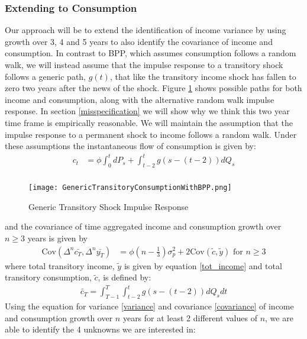 \documentclass[titlepage]{\econtex}\newcommand{\texname}{IncomeUncertainty}
\begin{document}
\subsubsection{Extending \cite{carroll_nature_1997} to Consumption}
Our approach will be to extend the identification of income variance by using growth over 3, 4 and 5 years to also identify the covariance of income and consumption. In contrast to BPP, which assumes consumption follows a random walk, we will instead assume that the impulse response to a transitory shock follows a generic path, $g(t)$, that like the transitory income shock has fallen to zero two years after the news of the shock. Figure \ref{fig:GenericTransitoryBPP} shows possible paths for both income and consumption, along with the alternative random walk impulse response. In section \ref{misspecification} we will show why we think this two year time frame is empirically reasonable. We will maintain the assumption that the impulse response to a permanent shock to income follows a random walk. Under these assumptions the instantaneous flow of consumption is given by:
	\begin{align*}
c_t  &= \phi \int_{0}^{t}dP_s  + \int_{t-2}^{t} g(s-(t-2))dQ_s  \\
\end{align*}
	\begin{figure} 
	\begin{centering}
		\texttt{[image: GenericTransitoryConsumptionWithBPP.png]} 
		\caption{Generic Transitory Shock Impulse Response}
		\label{fig:GenericTransitoryBPP}
	\end{centering}
\end{figure}
and the covariance of time aggregated income and consumption growth over $n \geq 3$ years is given by
	\begin{align}
\mathrm{Cov}(\Delta^n \bar{c_T},\Delta^n \bar{y_T} ) &= \phi (n-\frac{1}{3}) \sigma^2_p + 2 \mathrm{Cov}(\tilde{c},\tilde{y}) \text{  for  } n\geq 3 \label{covariance}
\end{align}
where total transitory income, $\tilde{y}$ is given by equation \ref{tot_income} and total transitory consumption, $\tilde{c}$, is defined by:
\begin{align}
\tilde{c_T} = \int_{T-1}^{T}\int_{t-2}^{t} g(s-(t-2))dQ_s dt \label{tot_cons}
\end{align}
Using the equation for variance \ref{variance} and covariance \ref{covariance} of income and consumption growth over $n$ years for at least 2 different values of $n$, we are able to identify the 4 unknowns we are interested in:
\end{document}
